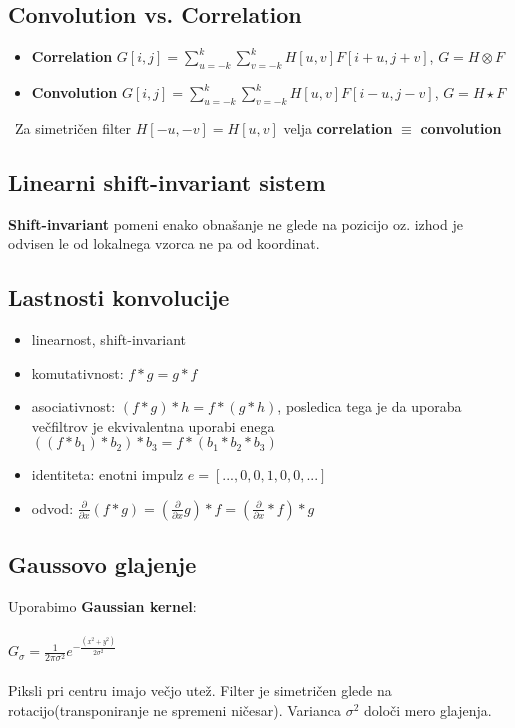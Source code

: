 \documentclass[11pt]{article}
\begin{document}
\newpage

\subsection{Convolution vs. Correlation}
\begin{itemize}
\item \textbf{Correlation} $G[i, j] = \sum\limits_{u=-k}^k\sum\limits_{v=-k}^kH[u, v]F[i+u, j+v]$, $G = H \otimes F$
\item \textbf{Convolution} $G[i, j] = \sum\limits_{u=-k}^k\sum\limits_{v=-k}^kH[u, v]F[i-u, j-v]$,
$G = H \star F$
\end{itemize}
\
Za simetri\v{c}en filter $H[-u, -v] = H[u, v]$ velja  \textbf{correlation} $\equiv$ \textbf{convolution}

\subsection{Linearni shift-invariant sistem}
\textbf{Shift-invariant} pomeni enako obna\v{s}anje ne glede na pozicijo oz. izhod je odvisen le od lokalnega vzorca ne pa od koordinat.

\subsection{Lastnosti konvolucije}
\begin{itemize}
\item linearnost, shift-invariant
\item komutativnost: $f * g = g * f$
\item asociativnost: $(f * g) * h = f * (g * h)$, posledica tega je da uporaba ve\v{c}filtrov je ekvivalentna uporabi enega $((f * b_1) * b_2) * b_3 = f * (b_1 * b_2 * b_3)$
\item identiteta: enotni impulz $e = [..., 0, 0, 1, 0, 0, ...]$
\item odvod: $\frac{\partial}{\partial x}(f * g) = (\frac{\partial}{\partial x}g) * f = (\frac{\partial}{\partial x} * f) * g$
\end{itemize}

\subsection{Gaussovo glajenje}
Uporabimo \textbf{Gaussian kernel}: \\
\\
\indent $G_\sigma = \frac{1}{2\pi\sigma^2}e^{-\frac{(x^2 + y^2)}{2\sigma^2}}$ \\
\\
Piksli pri centru imajo ve\v{c}jo ute\v{z}. Filter je simetri\v{c}en glede na rotacijo(transponiranje ne spremeni ni\v{c}esar). Varianca $\sigma^2$ dolo\v{c}i mero glajenja.
\end{document}
